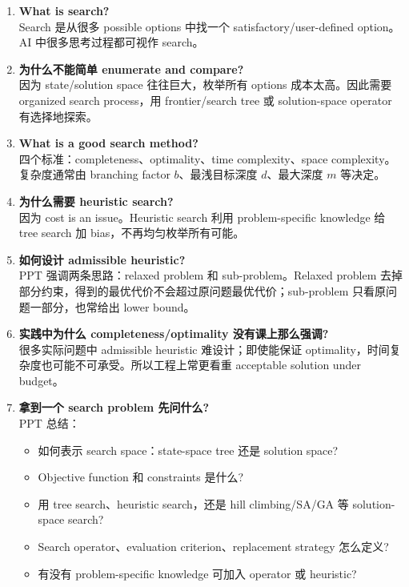 \documentclass[UTF8,11pt,a4paper]{ctexart}
\begin{document}
\begin{enumerate}
\item \textbf{What is search?}\\
Search 是从很多 possible options 中找一个 satisfactory/user-defined option。AI 中很多思考过程都可视作 search。

\item \textbf{为什么不能简单 enumerate and compare?}\\
因为 state/solution space 往往巨大，枚举所有 options 成本太高。因此需要 organized search process，用 frontier/search tree 或 solution-space operator 有选择地探索。

\item \textbf{What is a good search method?}\\
四个标准：completeness、optimality、time complexity、space complexity。复杂度通常由 branching factor $b$、最浅目标深度 $d$、最大深度 $m$ 等决定。

\item \textbf{为什么需要 heuristic search?}\\
因为 cost is an issue。Heuristic search 利用 problem-specific knowledge 给 tree search 加 bias，不再均匀枚举所有可能。

\item \textbf{如何设计 admissible heuristic?}\\
PPT 强调两条思路：relaxed problem 和 sub-problem。Relaxed problem 去掉部分约束，得到的最优代价不会超过原问题最优代价；sub-problem 只看原问题一部分，也常给出 lower bound。

\item \textbf{实践中为什么 completeness/optimality 没有课上那么强调?}\\
很多实际问题中 admissible heuristic 难设计；即使能保证 optimality，时间复杂度也可能不可承受。所以工程上常更看重 acceptable solution under budget。

\item \textbf{拿到一个 search problem 先问什么?}\\
PPT 总结：
\begin{itemize}
\item 如何表示 search space：state-space tree 还是 solution space?
\item Objective function 和 constraints 是什么?
\item 用 tree search、heuristic search，还是 hill climbing/SA/GA 等 solution-space search?
\item Search operator、evaluation criterion、replacement strategy 怎么定义?
\item 有没有 problem-specific knowledge 可加入 operator 或 heuristic?
\end{itemize}
\end{enumerate}
\end{document}

